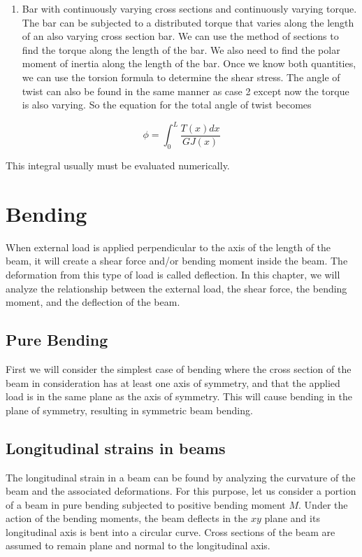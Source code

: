 \documentclass[a4paper,openany,12pt]{book}
\begin{document}
\begin{enumerate}
\item Bar with continuously varying cross sections and continuously varying
torque. The bar can be subjected to a distributed torque that varies
along the length of an also varying cross section bar. We can use the
method of sections to find the torque along the length of the bar. We
also need to find the polar moment of inertia along the length of the
bar. Once we know both quantities, we can use the torsion formula to
determine the shear stress. The angle of twist can also be found in
the same manner as case 2 except now the torque is also varying. So
the equation for the total angle of twist becomes
\end{enumerate}


$$\phi  = \int_0^L \frac{T(x)dx}{GJ(x)}$$

This integral usually must be evaluated numerically.

\section{Bending}
\label{sec:org58298b3}
When external load is applied perpendicular to the axis of the length of
the beam, it will create a shear force and/or bending moment inside the
beam. The deformation from this type of load is called deflection. In
this chapter, we will analyze the relationship between the external
load, the shear force, the bending moment, and the deflection of the
beam.

\subsection{Pure Bending}
\label{sec:org109fb66}
First we will consider the simplest case of bending where the cross
section of the beam in consideration has at least one axis of symmetry,
and that the applied load is in the same plane as the axis of symmetry.
This will cause bending in the plane of symmetry, resulting in symmetric
beam bending.

\subsection{Longitudinal strains in beams}
\label{sec:org2365798}
The longitudinal strain in a beam can be found by analyzing the
curvature of the beam and the associated deformations. For this purpose,
let us consider a portion of a beam in pure bending subjected to
positive bending moment \(M\). Under the action of the bending moments,
the beam deflects in the \(xy\) plane and its longitudinal axis is bent
into a circular curve. Cross sections of the beam are assumed to remain
plane and normal to the longitudinal axis.
\end{document}
